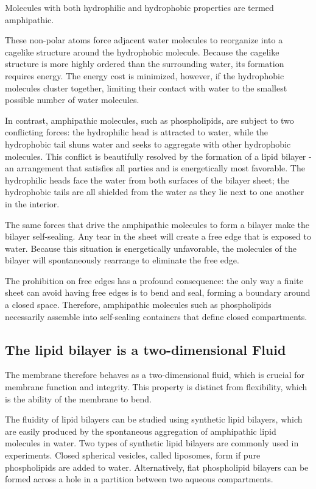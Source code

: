 Molecules with both hydrophilic and hydrophobic properties are termed
amphipathic.

These non-polar atoms force adjacent water molecules to reorganize into a cagelike
structure around the hydrophobic molecule. Because the
cagelike structure is more highly ordered than the surrounding water,
its formation requires energy. The energy cost is minimized, however, if
the hydrophobic molecules cluster together, limiting their contact with
water to the smallest possible number of water molecules.

In contrast, amphipathic molecules, such as phospholipids, are subject to two conflicting forces: the hydrophilic head is
attracted to water, while the hydrophobic tail shuns water and seeks to
aggregate with other hydrophobic molecules. This conflict is beautifully
resolved by the formation of a lipid bilayer - an arrangement that satisfies
all parties and is energetically most favorable. The hydrophilic heads
face the water from both surfaces of the bilayer sheet; the hydrophobic
tails are all shielded from the water as they lie next to one another in the
interior.

The same forces that drive the amphipathic molecules to form a bilayer
make the bilayer self-sealing. Any tear in the sheet will create a free edge
that is exposed to water. Because this situation is energetically unfavorable,
the molecules of the bilayer will spontaneously rearrange to eliminate
the free edge.

The prohibition on free edges has a profound consequence: the only way
a finite sheet can avoid having free edges is to bend and seal, forming a
boundary around a closed space. Therefore, amphipathic
molecules such as phospholipids necessarily assemble into self-sealing
containers that define closed compartments.

\subsection{The lipid bilayer is a two-dimensional Fluid}

The membrane therefore behaves as a two-dimensional fluid, which is crucial for membrane function and integrity.
This property is distinct from flexibility, which is the ability of
the membrane to bend.

The fluidity of lipid bilayers can be studied using synthetic lipid bilayers,
which are easily produced by the spontaneous aggregation of amphipathic
lipid molecules in water. Two types of synthetic lipid bilayers are
commonly used in experiments. Closed spherical vesicles, called liposomes,
form if pure phospholipids are added to water. Alternatively, flat
phospholipid bilayers can be formed across a hole in a partition between
two aqueous compartments.

